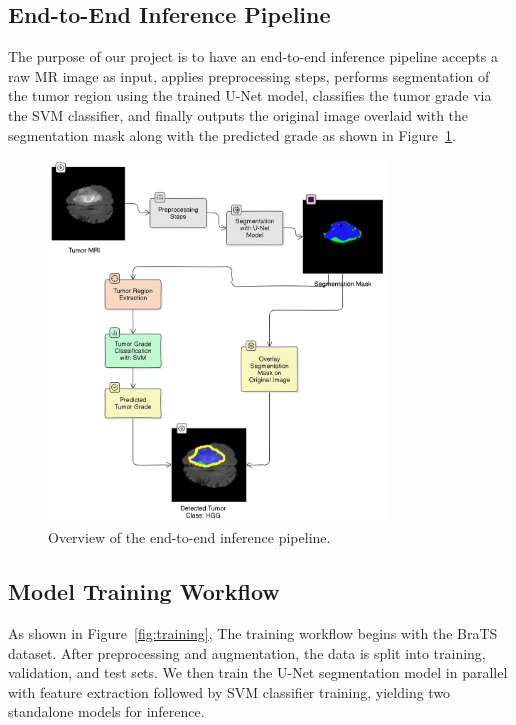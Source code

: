 \subsection{End-to-End Inference Pipeline}
The purpose of our project is to have an end-to-end inference pipeline accepts a raw MR image as input, applies preprocessing steps, performs segmentation of the tumor region using the trained U-Net model, classifies the tumor grade via the SVM classifier, and finally outputs the original image overlaid with the segmentation mask along with the predicted grade as shown in Figure~\ref{fig:pipeline}.
\begin{figure}[H]
  \centering
  \includegraphics[width=0.8\textwidth]{Images/Chapter3/pipeline.png}
  \caption{Overview of the end-to-end inference pipeline.}
  \label{fig:pipeline}
\end{figure}


\subsection{Model Training Workflow}
As shown in Figure~\ref{fig:training}, The training workflow begins with the BraTS dataset. After preprocessing and augmentation, the data is split into training, validation, and test sets. We then train the U-Net segmentation model in parallel with feature extraction followed by SVM classifier training, yielding two standalone models for inference.

